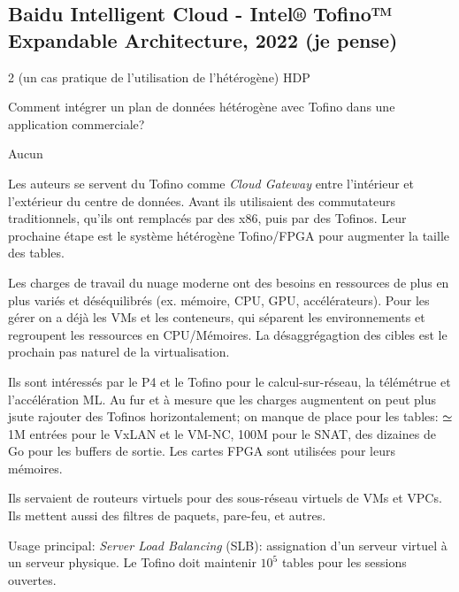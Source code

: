 
\subsection{Baidu Intelligent Cloud - Intel® Tofino™ Expandable Architecture, 2022 (je pense)}
 2 (un cas pratique de l'utilisation de l'hétérogène)
 HDP

 Comment intégrer un plan de données hétérogène avec Tofino dans une application commerciale?

 Aucun


 Les auteurs se servent du Tofino comme \emph{Cloud Gateway} entre l'intérieur et l'extérieur du centre de données. Avant ils utilisaient des commutateurs traditionnels, qu'ils ont remplacés par des x86, puis par des Tofinos. Leur prochaine étape est le système hétérogène Tofino/FPGA pour augmenter la taille des tables.


Les charges de travail du nuage moderne ont des besoins en ressources de plus en plus variés et déséquilibrés (ex. mémoire, CPU, GPU, accélérateurs). Pour les gérer on a déjà les VMs et les conteneurs, qui séparent les environnements et regroupent les ressources en CPU/Mémoires. La désaggrégagtion des cibles est le prochain pas naturel de la virtualisation.


Ils sont intéressés par le P4 et le Tofino pour le calcul-sur-réseau, la télémétrue et l'accélération ML. Au fur et à mesure que les charges augmentent on peut plus jsute rajouter des Tofinos horizontalement; on manque de place pour les tables: $\simeq $ 1M entrées pour le VxLAN et le VM-NC, 100M pour le SNAT, des dizaines de Go pour les buffers de sortie. Les cartes FPGA sont utilisées pour leurs mémoires.


Ils servaient de routeurs virtuels pour des sous-réseau virtuels de VMs et VPCs. Ils mettent aussi des filtres de paquets, pare-feu, et autres.

Usage principal: \emph{Server Load Balancing} (SLB): assignation d'un serveur virtuel à un serveur physique. Le Tofino doit maintenir $10^5$ tables pour les sessions ouvertes.

